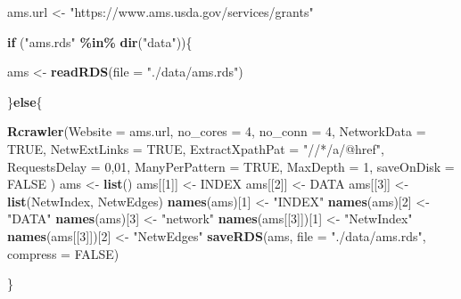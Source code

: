 \documentclass[
]{article}
\newenvironment{Shaded}{\begin{snugshade}}{\end{snugshade}}
\newcommand{\AttributeTok}[1]{\textcolor[rgb]{0.13,0.29,0.53}{#1}}
\newcommand{\ConstantTok}[1]{\textcolor[rgb]{0.56,0.35,0.01}{#1}}
\newcommand{\ControlFlowTok}[1]{\textcolor[rgb]{0.13,0.29,0.53}{\textbf{#1}}}
\newcommand{\DecValTok}[1]{\textcolor[rgb]{0.00,0.00,0.81}{#1}}
\newcommand{\FunctionTok}[1]{\textcolor[rgb]{0.13,0.29,0.53}{\textbf{#1}}}
\newcommand{\NormalTok}[1]{#1}
\newcommand{\OtherTok}[1]{\textcolor[rgb]{0.56,0.35,0.01}{#1}}
\newcommand{\SpecialCharTok}[1]{\textcolor[rgb]{0.81,0.36,0.00}{\textbf{#1}}}
\newcommand{\StringTok}[1]{\textcolor[rgb]{0.31,0.60,0.02}{#1}}
\begin{document}
\begin{Shaded}
\begin{Highlighting}[]
\NormalTok{ams.url }\OtherTok{\textless{}{-}} \StringTok{"https://www.ams.usda.gov/services/grants"}

\ControlFlowTok{if}\NormalTok{ (}\StringTok{"ams.rds"} \SpecialCharTok{\%in\%} \FunctionTok{dir}\NormalTok{(}\StringTok{"data"}\NormalTok{))\{}

\NormalTok{    ams }\OtherTok{\textless{}{-}} \FunctionTok{readRDS}\NormalTok{(}\AttributeTok{file =} \StringTok{"./data/ams.rds"}\NormalTok{)}

\NormalTok{\}}\ControlFlowTok{else}\NormalTok{\{}

    \FunctionTok{Rcrawler}\NormalTok{(}\AttributeTok{Website =}\NormalTok{ ams.url,}
             \AttributeTok{no\_cores =} \DecValTok{4}\NormalTok{, }\AttributeTok{no\_conn =} \DecValTok{4}\NormalTok{, }
             \AttributeTok{NetworkData =} \ConstantTok{TRUE}\NormalTok{,}
             \AttributeTok{NetwExtLinks =} \ConstantTok{TRUE}\NormalTok{, }
             \AttributeTok{ExtractXpathPat =} \StringTok{"//*/a/@href"}\NormalTok{,}
             \AttributeTok{RequestsDelay =} \DecValTok{0}\NormalTok{,}\DecValTok{01}\NormalTok{,}
             \AttributeTok{ManyPerPattern =} \ConstantTok{TRUE}\NormalTok{, }\AttributeTok{MaxDepth =} \DecValTok{1}\NormalTok{, }
             \AttributeTok{saveOnDisk =} \ConstantTok{FALSE}
\NormalTok{             )}
\NormalTok{    ams }\OtherTok{\textless{}{-}} \FunctionTok{list}\NormalTok{()}
\NormalTok{    ams[[}\DecValTok{1}\NormalTok{]] }\OtherTok{\textless{}{-}}\NormalTok{ INDEX}
\NormalTok{    ams[[}\DecValTok{2}\NormalTok{]] }\OtherTok{\textless{}{-}}\NormalTok{ DATA}
\NormalTok{    ams[[}\DecValTok{3}\NormalTok{]] }\OtherTok{\textless{}{-}} \FunctionTok{list}\NormalTok{(NetwIndex, NetwEdges)}
    \FunctionTok{names}\NormalTok{(ams)[}\DecValTok{1}\NormalTok{] }\OtherTok{\textless{}{-}} \StringTok{"INDEX"}
    \FunctionTok{names}\NormalTok{(ams)[}\DecValTok{2}\NormalTok{] }\OtherTok{\textless{}{-}} \StringTok{"DATA"}
    \FunctionTok{names}\NormalTok{(ams)[}\DecValTok{3}\NormalTok{] }\OtherTok{\textless{}{-}} \StringTok{"network"}
    \FunctionTok{names}\NormalTok{(ams[[}\DecValTok{3}\NormalTok{]])[}\DecValTok{1}\NormalTok{] }\OtherTok{\textless{}{-}} \StringTok{"NetwIndex"}
    \FunctionTok{names}\NormalTok{(ams[[}\DecValTok{3}\NormalTok{]])[}\DecValTok{2}\NormalTok{] }\OtherTok{\textless{}{-}} \StringTok{"NetwEdges"}
    \FunctionTok{saveRDS}\NormalTok{(ams, }\AttributeTok{file =} \StringTok{"./data/ams.rds"}\NormalTok{, }\AttributeTok{compress =} \ConstantTok{FALSE}\NormalTok{)}

\NormalTok{\}}
\end{Highlighting}
\end{Shaded}
\end{document}
